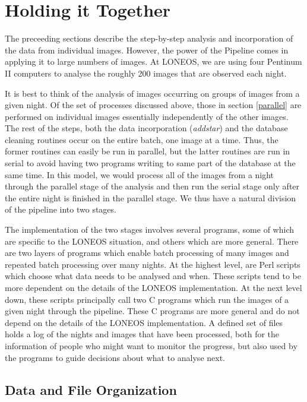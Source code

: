 \documentclass{article}
\newcommand\pr{\em}                   %
\begin{document}
\section{Holding it Together}

The preceeding sections describe the step-by-step analysis and
incorporation of the data from individual images.  However, the power
of the Pipeline comes in applying it to large numbers of images.  At
LONEOS, we are using four Pentinum II computers to analyse the roughly 200
images that are observed each night.  

It is best to think of the analysis of images occurring on groups of
images from a given night.  Of the set of processes discussed above,
those in section \ref{parallel} are performed on individual images
essentially independently of the other images.  The rest of the steps,
both the data incorporation ({\pr addstar}) and the database cleaning
routines occur on the entire batch, one image at a time.  Thus, the
former routines can easily be run in parallel, but the latter routines
are run in serial to avoid having two programs writing to same part of
the database at the same time.  In this model, we would process all of
the images from a night through the parallel stage of the analysis and
then run the serial stage only after the entire night is finished in
the parallel stage.  We thus have a natural division of the pipeline
into two stages.  

The implementation of the two stages involves several programs, some
of which are specific to the LONEOS situation, and others which are
more general.  There are two layers of programs which enable batch
processing of many images and repeated batch processing over many
nights.  At the highest level, are Perl scripts which choose what data
needs to be analysed and when.  These scripts tend to be more
dependent on the details of the LONEOS implementation. At the next
level down, these scripts principally call two C programs which run
the images of a given night through the pipeline.  These C programs
are more general and do not depend on the details of the LONEOS
implementation.  A defined set of files holds a log of the nights and
images that have been processed, both for the information of people
who might want to monitor the progress, but also used by the programs
to guide decisions about what to analyse next.

\subsection{Data and File Organization}
\end{document}
